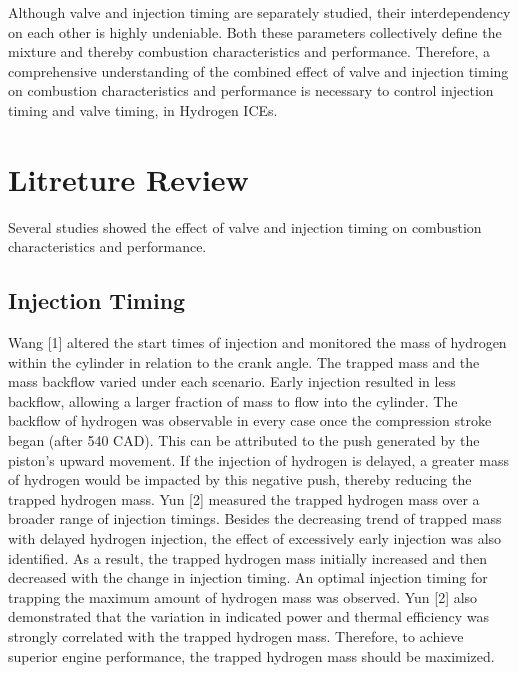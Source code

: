\documentclass[conference]{IEEEtran}
\begin{document}
Although valve and injection timing are separately studied, their interdependency on each other is highly undeniable. Both these parameters collectively define the mixture and thereby combustion characteristics and performance. Therefore, a comprehensive understanding of the combined effect of valve and injection timing on combustion characteristics and performance is necessary to control injection timing and valve timing, in Hydrogen ICEs.
\section{Litreture Review}

Several studies showed the effect of valve and injection timing on combustion characteristics and performance.
\subsection{Injection Timing}

Wang [1] altered the start times of injection and monitored the mass of hydrogen within the cylinder in relation to the crank angle. The trapped mass and the mass backflow varied under each scenario. Early injection resulted in less backflow, allowing a larger fraction of mass to flow into the cylinder. The backflow of hydrogen was observable in every case once the compression stroke began (after 540 CAD). This can be attributed to the push generated by the piston’s upward movement. If the injection of hydrogen is delayed, a greater mass of hydrogen would be impacted by this negative push, thereby reducing the trapped hydrogen mass. Yun [2] measured the trapped hydrogen mass over a broader range of injection timings. Besides the decreasing trend of trapped mass with delayed hydrogen injection, the effect of excessively early injection was also identified. As a result, the trapped hydrogen mass initially increased and then decreased with the change in injection timing. An optimal injection timing for trapping the maximum amount of hydrogen mass was observed. Yun [2] also demonstrated that the variation in indicated power and thermal efficiency was strongly correlated with the trapped hydrogen mass. Therefore, to achieve superior engine performance, the trapped hydrogen mass should be maximized.\\
\end{document}
